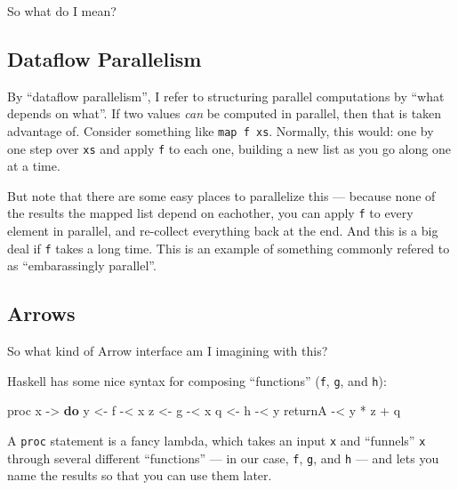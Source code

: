 \documentclass[]{article}
\newenvironment{Shaded}{}{}
\newcommand{\FunctionTok}[1]{\textcolor[rgb]{0.02,0.16,0.49}{#1}}
\newcommand{\KeywordTok}[1]{\textcolor[rgb]{0.00,0.44,0.13}{\textbf{#1}}}
\newcommand{\NormalTok}[1]{#1}
\newcommand{\OtherTok}[1]{\textcolor[rgb]{0.00,0.44,0.13}{#1}}
\begin{document}
So what do I mean?

\hypertarget{dataflow-parallelism}{%
\subsection{Dataflow Parallelism}\label{dataflow-parallelism}}

By ``dataflow parallelism'', I refer to structuring parallel computations by
``what depends on what''. If two values \emph{can} be computed in parallel, then
that is taken advantage of. Consider something like \texttt{map\ f\ xs}.
Normally, this would: one by one step over \texttt{xs} and apply \texttt{f} to
each one, building a new list as you go along one at a time.

But note that there are some easy places to parallelize this --- because none of
the results the mapped list depend on eachother, you can apply \texttt{f} to
every element in parallel, and re-collect everything back at the end. And this
is a big deal if \texttt{f} takes a long time. This is an example of something
commonly refered to as ``embarassingly parallel''.

\hypertarget{arrows}{%
\subsection{Arrows}\label{arrows}}

So what kind of Arrow interface am I imagining with this?

Haskell has some nice syntax for composing ``functions'' (\texttt{f},
\texttt{g}, and \texttt{h}):

\begin{Shaded}
\begin{Highlighting}[]
\NormalTok{proc x }\OtherTok{->} \KeywordTok{do}
\NormalTok{    y }\OtherTok{<-}\NormalTok{ f }\FunctionTok{-<}\NormalTok{ x}
\NormalTok{    z }\OtherTok{<-}\NormalTok{ g }\FunctionTok{-<}\NormalTok{ x}
\NormalTok{    q }\OtherTok{<-}\NormalTok{ h }\FunctionTok{-<}\NormalTok{ y}
\NormalTok{    returnA }\FunctionTok{-<}\NormalTok{ y }\FunctionTok{*}\NormalTok{ z }\FunctionTok{+}\NormalTok{ q}
\end{Highlighting}
\end{Shaded}

A \texttt{proc} statement is a fancy lambda, which takes an input \texttt{x} and
``funnels'' \texttt{x} through several different ``functions'' --- in our case,
\texttt{f}, \texttt{g}, and \texttt{h} --- and lets you name the results so that
you can use them later.
\end{document}
